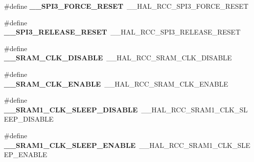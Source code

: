 \begin{DoxyCompactItemize}
\item 
\hypertarget{group___h_a_l___r_c_c___aliased_ga5c8c0742752582b7b303fab8f23d1b3f}{\#define {\bfseries \-\_\-\-\_\-\-S\-P\-I3\-\_\-\-F\-O\-R\-C\-E\-\_\-\-R\-E\-S\-E\-T}~\-\_\-\-\_\-\-H\-A\-L\-\_\-\-R\-C\-C\-\_\-\-S\-P\-I3\-\_\-\-F\-O\-R\-C\-E\-\_\-\-R\-E\-S\-E\-T}\label{group___h_a_l___r_c_c___aliased_ga5c8c0742752582b7b303fab8f23d1b3f}

\item 
\hypertarget{group___h_a_l___r_c_c___aliased_ga1f3cef9cff8877c578e230b3518f041d}{\#define {\bfseries \-\_\-\-\_\-\-S\-P\-I3\-\_\-\-R\-E\-L\-E\-A\-S\-E\-\_\-\-R\-E\-S\-E\-T}~\-\_\-\-\_\-\-H\-A\-L\-\_\-\-R\-C\-C\-\_\-\-S\-P\-I3\-\_\-\-R\-E\-L\-E\-A\-S\-E\-\_\-\-R\-E\-S\-E\-T}\label{group___h_a_l___r_c_c___aliased_ga1f3cef9cff8877c578e230b3518f041d}

\item 
\hypertarget{group___h_a_l___r_c_c___aliased_gac14e78a1860eadfef155f497a8660b6b}{\#define {\bfseries \-\_\-\-\_\-\-S\-R\-A\-M\-\_\-\-C\-L\-K\-\_\-\-D\-I\-S\-A\-B\-L\-E}~\-\_\-\-\_\-\-H\-A\-L\-\_\-\-R\-C\-C\-\_\-\-S\-R\-A\-M\-\_\-\-C\-L\-K\-\_\-\-D\-I\-S\-A\-B\-L\-E}\label{group___h_a_l___r_c_c___aliased_gac14e78a1860eadfef155f497a8660b6b}

\item 
\hypertarget{group___h_a_l___r_c_c___aliased_gabb6fb0307de12ccb1d30d2a167f2e4bb}{\#define {\bfseries \-\_\-\-\_\-\-S\-R\-A\-M\-\_\-\-C\-L\-K\-\_\-\-E\-N\-A\-B\-L\-E}~\-\_\-\-\_\-\-H\-A\-L\-\_\-\-R\-C\-C\-\_\-\-S\-R\-A\-M\-\_\-\-C\-L\-K\-\_\-\-E\-N\-A\-B\-L\-E}\label{group___h_a_l___r_c_c___aliased_gabb6fb0307de12ccb1d30d2a167f2e4bb}

\item 
\hypertarget{group___h_a_l___r_c_c___aliased_ga0d71b1d9473d534a251bf5aa021d34c6}{\#define {\bfseries \-\_\-\-\_\-\-S\-R\-A\-M1\-\_\-\-C\-L\-K\-\_\-\-S\-L\-E\-E\-P\-\_\-\-D\-I\-S\-A\-B\-L\-E}~\-\_\-\-\_\-\-H\-A\-L\-\_\-\-R\-C\-C\-\_\-\-S\-R\-A\-M1\-\_\-\-C\-L\-K\-\_\-\-S\-L\-E\-E\-P\-\_\-\-D\-I\-S\-A\-B\-L\-E}\label{group___h_a_l___r_c_c___aliased_ga0d71b1d9473d534a251bf5aa021d34c6}

\item 
\hypertarget{group___h_a_l___r_c_c___aliased_ga790fe597a6e1fbe314256d83534bc539}{\#define {\bfseries \-\_\-\-\_\-\-S\-R\-A\-M1\-\_\-\-C\-L\-K\-\_\-\-S\-L\-E\-E\-P\-\_\-\-E\-N\-A\-B\-L\-E}~\-\_\-\-\_\-\-H\-A\-L\-\_\-\-R\-C\-C\-\_\-\-S\-R\-A\-M1\-\_\-\-C\-L\-K\-\_\-\-S\-L\-E\-E\-P\-\_\-\-E\-N\-A\-B\-L\-E}\label{group___h_a_l___r_c_c___aliased_ga790fe597a6e1fbe314256d83534bc539}


\end{DoxyCompactItemize}

